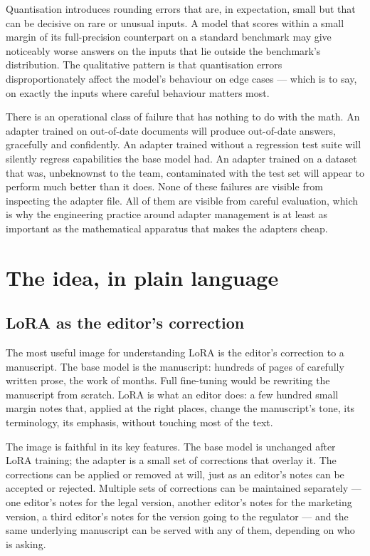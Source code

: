 Quantisation introduces rounding errors that are, in
expectation, small but that can be decisive on rare or
unusual inputs. A model that scores within a small margin of
its full-precision counterpart on a standard benchmark may
give noticeably worse answers on the inputs that lie outside
the benchmark's distribution. The qualitative pattern is that
quantisation errors disproportionately affect the model's
behaviour on edge cases --- which is to say, on exactly the
inputs where careful behaviour matters most.

There is an operational class of failure that has nothing to
do with the math. An adapter trained on out-of-date documents
will produce out-of-date answers, gracefully and confidently.
An adapter trained without a regression test suite will
silently regress capabilities the base model had. An adapter
trained on a dataset that was, unbeknownst to the team,
contaminated with the test set will appear to perform much
better than it does. None of these failures are visible from
inspecting the adapter file. All of them are visible from
careful evaluation, which is why the engineering practice
around adapter management is at least as important as the
mathematical apparatus that makes the adapters cheap.

\section{The idea, in plain language}

\subsection*{LoRA as the editor's correction}

The most useful image for understanding LoRA is the editor's
correction to a manuscript. The base model is the manuscript:
hundreds of pages of carefully written prose, the work of
months. Full fine-tuning would be rewriting the manuscript from
scratch. LoRA is what an editor does: a few hundred small
margin notes that, applied at the right places, change the
manuscript's tone, its terminology, its emphasis, without
touching most of the text.

The image is faithful in its key features. The base model is
unchanged after LoRA training; the adapter is a small set of
corrections that overlay it. The corrections can be applied or
removed at will, just as an editor's notes can be accepted or
rejected. Multiple sets of corrections can be maintained
separately --- one editor's notes for the legal version, another
editor's notes for the marketing version, a third editor's
notes for the version going to the regulator --- and the same
underlying manuscript can be served with any of them, depending
on who is asking.

